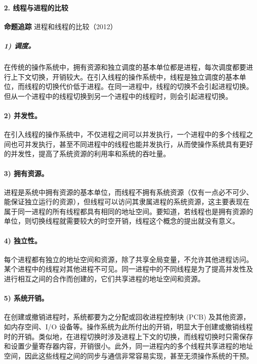 \documentclass{ctexbook}
\begin{document}
	\paragraph{2. 线程与进程的比较}
	
	\textbf{命题追踪} 进程和线程的比较（2012）
	
	\subparagraph{1) 调度。}
	在传统的操作系统中，拥有资源和独立调度的基本单位都是进程，每次调度都要进行上下文切换，开销较大。在引入线程的操作系统中，线程是独立调度的基本单位，而线程的切换代价低于进程。在同一进程中，线程的切换不会引起进程切换。但从一个进程中的线程切换到另一个进程中的线程时，则会引起进程切换。
	
	\paragraph{2) 并发性。}
	在引入线程的操作系统中，不仅进程之间可以并发执行，一个进程中的多个线程之间也可并发执行，甚至不同进程中的线程也能并发执行，从而使操作系统具有更好的并发性，提高了系统资源的利用率和系统的吞吐量。
	
	\paragraph{3) 拥有资源。}
	进程是系统中拥有资源的基本单位，而线程不拥有系统资源（仅有一点必不可少、能保证独立运行的资源），但线程可以访问其隶属进程的系统资源，这主要表现在属于同一进程的所有线程都具有相同的地址空间。要知道，若线程也是拥有资源的单位，则切换线程就需要较大的时空开销，线程这个概念的提出就没有意义。
	
	\paragraph{4) 独立性。}
	每个进程都有独立的地址空间和资源，除了共享全局变量，不允许其他进程访问。某个进程中的线程对其他进程不可见。同一进程中的不同线程是为了提高并发性及进行相互之间的合作而创建的，它们共享进程的地址空间和资源。
	
	\paragraph{5) 系统开销。}
	在创建或撤销进程时，系统都要为之分配或回收进程控制块 (PCB) 及其他资源，如内存空间、I/O 设备等。操作系统为此所付出的开销，明显大于创建或撤销线程时的开销。类似地，在进程切换时涉及进程上下文的切换，而线程切换时只需保存和设置少量寄存器内容，开销很小。此外，同一进程内的多个线程共享进程的地址空间，因此这些线程之间的同步与通信非常容易实现，甚至无须操作系统的干预。
	
\end{document}
